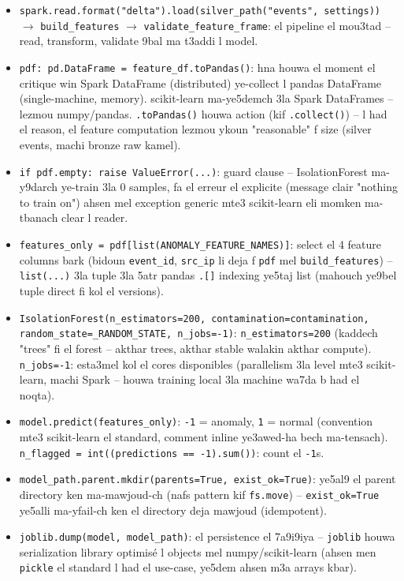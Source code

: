 \documentclass[11pt,a4paper]{report}
\DeclareRobustCommand{\code}[1]{\texttt{#1}}
\begin{document}
\begin{itemize}
  \item \code{spark.read.format("delta").load(silver\_path("events", settings))}
        $\to$ \code{build\_features} $\to$ \code{validate\_feature\_frame}:
        el pipeline el mou3tad -- read, transform, validate 9bal ma
        t3addi l model.
  \item \code{pdf: pd.DataFrame = feature\_df.toPandas()}: hna houwa el
        moment el critique win Spark DataFrame (distributed) ye-collect
        l pandas DataFrame (single-machine, memory). scikit-learn
        ma-ye5demch 3la Spark DataFrames -- lezmou numpy/pandas.
        \code{.toPandas()} houwa action (kif \code{.collect()}) --
        l had el reason, el feature computation lezmou ykoun "reasonable"
        f size (silver events, machi bronze raw kamel).
  \item \code{if pdf.empty: raise ValueError(...)}: guard clause -- IsolationForest
        ma-y9darch ye-train 3la 0 samples, fa el erreur el explicite
        (message clair "nothing to train on") ahsen mel exception generic
        mte3 scikit-learn eli momken ma-tbanach clear l reader.
  \item \code{features\_only = pdf[list(ANOMALY\_FEATURE\_NAMES)]}: select
        el 4 feature columns bark (bidoun \code{event\_id}, \code{src\_ip}
        li deja f \code{pdf} mel \code{build\_features}) -- \code{list(...)}
        3la tuple 3la 5atr pandas \code{.[]} indexing ye5taj list (mahouch
        ye9bel tuple direct fi kol el versions).
  \item \code{IsolationForest(n\_estimators=200, contamination=contamination,
        random\_state=\_RANDOM\_STATE, n\_jobs=-1)}: \code{n\_estimators=200}
        (kaddech "trees" fi el forest -- akthar trees, akthar stable
        walakin akthar compute). \code{n\_jobs=-1}: esta3mel kol el cores
        disponibles (parallelism 3la level mte3 scikit-learn, machi
        Spark -- houwa training local 3la machine wa7da b had el noqta).
  \item \code{model.predict(features\_only)}: \code{-1} = anomaly, \code{1}
        = normal (convention mte3 scikit-learn el standard, comment
        inline ye3awed-ha bech ma-tensach). \code{n\_flagged = int((predictions
        == -1).sum())}: count el \code{-1}s.
  \item \code{model\_path.parent.mkdir(parents=True, exist\_ok=True)}:
        ye5al9 el parent directory ken ma-mawjoud-ch (nafs pattern kif
        \code{fs.move}) -- \code{exist\_ok=True} ye5alli ma-yfail-ch ken
        el directory deja mawjoud (idempotent).
  \item \code{joblib.dump(model, model\_path)}: el persistence el 7a9i9iya
        -- \code{joblib} houwa serialization library optimisé l objects
        mel numpy/scikit-learn (ahsen men \code{pickle} el standard l
        had el use-case, ye5dem ahsen m3a arrays kbar).
\end{itemize}
\end{document}
